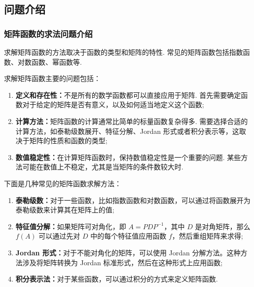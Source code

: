    \subsection{问题介绍}
        \subsubsection{矩阵函数的求法问题介绍}
            \par 求解矩阵函数的方法取决于函数的类型和矩阵的特性. 常见的矩阵函数包括指数函数、对数函数、幂函数等.
            \par 求解矩阵函数主要的问题包括：
            \begin{enumerate}
                \item \textbf{定义和存在性：}不是所有的数学函数都可以直接应用于矩阵. 首先需要确定函数对于给定的矩阵是否有意义，以及如何适当地定义这个函数;
                \item \textbf{计算方法：}矩阵函数的计算通常比简单的标量函数复杂得多. 需要选择合适的计算方法，如泰勒级数展开、特征分解、Jordan 形式或者积分表示等，这取决于矩阵的性质和函数的类型;
                \item \textbf{数值稳定性：}在计算矩阵函数时，保持数值稳定性是一个重要的问题. 某些方法可能在数值上不稳定，尤其是当矩阵的条件数较大时.
            \end{enumerate}
            \par 下面是几种常见的矩阵函数求解方法：
            \begin{enumerate}
                \item \textbf{泰勒级数：}对于一些函数，比如指数函数和对数函数，可以通过将函数展开为泰勒级数来计算其在矩阵上的值;
                \item \textbf{特征值分解：}如果矩阵可对角化，即 $A = PDP^{-1}$，其中 $D$ 是对角矩阵，那么 $f(A)$ 可以通过先对 $D$ 中的每个特征值应用函数 $f$，然后重组矩阵来求得;
                \item \textbf{Jordan 形式：}对于不能对角化的矩阵，可以使用 Jordan 分解方法。这种方法涉及将矩阵转换为 Jordan 标准形式，然后在这种形式上应用函数;
                \item \textbf{积分表示法：}对于某些函数，可以通过积分的方式来定义矩阵函数.
            \end{enumerate}

